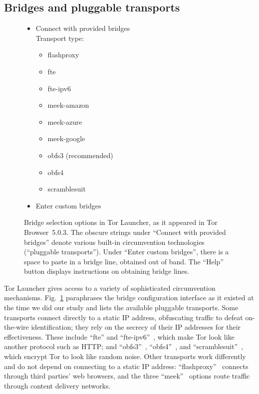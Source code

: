 \documentclass[USenglish,oneside,twocolumn]{article}
\begin{document}
\subsection{Bridges and pluggable transports}

\begin{figure}
\small
\begin{itemize}
\renewcommand{\labelitemi}{$\circ$}
\item Connect with provided bridges\\
Transport type:
\begin{itemize}
\item flashproxy
\item fte
\item fte-ipv6
\item meek-amazon
\item meek-azure
\item meek-google
\item obfs3 (recommended)
\item obfs4
\item scramblesuit
\end{itemize}
\item Enter custom bridges\qquad{}\\
\end{itemize}
\caption{
Bridge selection options in Tor Launcher, as it appeared in Tor Browser~5.0.3.
The obscure strings under ``Connect with provided bridges'' denote various
built-in circumvention technologies (``pluggable transports'').
Under ``Enter custom bridges'', there is a space to paste in
a bridge line, obtained out of band.
The ``Help'' button displays instructions on obtaining
bridge lines.
}
\label{fig:bridge-options}
\end{figure}

Tor Launcher gives access to a variety of sophisticated
circumvention mechanisms.
Fig.~\ref{fig:bridge-options} paraphrases the bridge configuration
interface as it existed at the time we did our study
and lists the available pluggable transports.
Some transports connect directly to a static IP address,
obfuscating traffic to defeat on-the-wire identification;
they rely on the secrecy of their IP addresses for their effectiveness.
These include ``fte'' and ``fte-ipv6''~\cite{fte},
which make Tor look like another protocol such as HTTP; and
``obfs3''~\cite{obfs3}, ``obfs4''~\cite{obfs4}, and ``scramblesuit''~\cite{scramblesuit},
which encrypt Tor to look like random noise.
Other transports work differently and do not depend on connecting to a static IP address:
``flashproxy''~\cite{flashproxy} connects through third parties' web browsers,
and the three ``meek''~\cite{fifield2015blocking} options route traffic
through content delivery networks.
\end{document}

